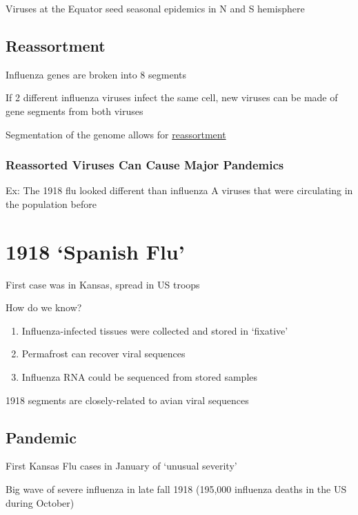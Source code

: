 \documentclass{notes}
\begin{document}
\tab \indicates Viruses at the Equator seed seasonal epidemics in N and S hemisphere

\subsection{Reassortment}

Influenza genes are broken into 8 segments

If 2 different influenza viruses infect the same cell, new viruses can be made of gene segments from both viruses

\tab \indicates Segmentation of the genome allows for \underline{reassortment}

\subsubsection{Reassorted Viruses Can Cause Major Pandemics}

\tab Ex: The 1918 flu looked different than influenza A viruses that were circulating in the population before


\section{1918 `Spanish Flu'}

First case was in Kansas, spread in US troops

How do we know?

\begin{enumerate}
    \item Influenza-infected tissues were collected and stored in `fixative'
    \item Permafrost can recover viral sequences
    \item Influenza RNA could be sequenced from stored samples
\end{enumerate}

1918 segments are closely-related to avian viral sequences

\subsection{Pandemic}

First Kansas Flu cases in January of `unusual severity'

\indicates Big wave of severe influenza in late fall 1918 (195,000 influenza deaths in the US during October)
\end{document}
